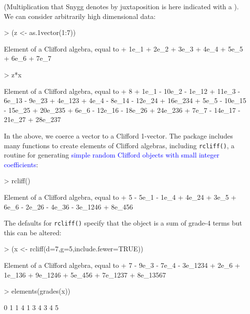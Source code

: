 \documentclass{birkjour}
\theoremstyle{definition}
\theoremstyle{remark}
\numberwithin{equation}{section}
\begin{document}
(Multiplication that Snygg denotes by juxtaposition is here indicated
with a {\tt *}).  We can consider arbitrarily high dimensional data:

\begin{Schunk}
\begin{Sinput}
> (z <- as.1vector(1:7))
\end{Sinput}
\begin{Soutput}
Element of a Clifford algebra, equal to
+ 1e_1 + 2e_2 + 3e_3 + 4e_4 + 5e_5 + 6e_6 + 7e_7
\end{Soutput}
\begin{Sinput}
> z*x
\end{Sinput}
\begin{Soutput}
Element of a Clifford algebra, equal to
+ 8 + 1e_1 - 10e_2 - 1e_12 + 11e_3 - 6e_13 - 9e_23 + 4e_123 + 4e_4 - 8e_14 -
12e_24 + 16e_234 + 5e_5 - 10e_15 - 15e_25 + 20e_235 + 6e_6 - 12e_16 - 18e_26 +
24e_236 + 7e_7 - 14e_17 - 21e_27 + 28e_237
\end{Soutput}
\end{Schunk}

In the above, we coerce a vector to a Clifford 1-vector.  The package
includes many functions to create elements of Clifford algebras,
including {\tt rcliff()}, a routine for generating
\textcolor{blue}{simple random Clifford objects with small integer
  coefficients}:

\begin{Schunk}
\begin{Sinput}
> rcliff()
\end{Sinput}
\begin{Soutput}
Element of a Clifford algebra, equal to
+ 5 - 5e_1 - 1e_4 + 4e_24 + 3e_5 + 6e_6 - 2e_26 - 4e_36 - 3e_1246 + 8e_456
\end{Soutput}
\end{Schunk}

The defaults for {\tt rcliff()} specify that the object is a sum of
grade-4 terms but this can be altered:

\begin{Schunk}
\begin{Sinput}
> (x <- rcliff(d=7,g=5,include.fewer=TRUE))
\end{Sinput}
\begin{Soutput}
Element of a Clifford algebra, equal to
+ 7 - 9e_3 - 7e_4 - 3e_1234 + 2e_6 + 1e_136 + 9e_1246 + 5e_456 + 7e_1237 +
8e_13567
\end{Soutput}
\begin{Sinput}
> elements(grades(x))
\end{Sinput}
\begin{Soutput}
 [1] 0 1 1 4 1 3 4 3 4 5
\end{Soutput}
\end{Schunk}
\end{document}
